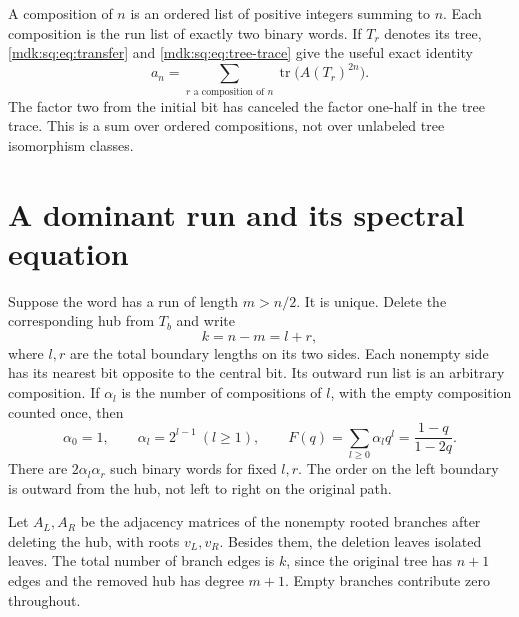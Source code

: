 \documentclass[11pt,letterpaper]{article}
\numberwithin{equation}{section}
\theoremstyle{remark}\newtheorem{remark}[theorem]{Remark}
\DeclareMathOperator{\tr}{tr}\DeclareMathOperator{\TV}{TV}
\begin{document}
A composition of $n$ is an ordered list of positive integers summing to $n$. Each composition is the run list of exactly two binary words. If $T_r$ denotes its tree, \eqref{mdk:sq:eq:transfer} and \eqref{mdk:sq:eq:tree-trace} give the useful exact identity
\begin{equation}\label{mdk:sq:eq:composition}
a_n=\sum_{r\text{ a composition of }n}\tr\bigl(A(T_r)^{2n}\bigr).
\end{equation}
The factor two from the initial bit has canceled the factor one-half in the tree trace. This is a sum over ordered compositions, not over unlabeled tree isomorphism classes.

\section{A dominant run and its spectral equation}\label{mdk:sq:sec:long}
Suppose the word has a run of length $m>n/2$. It is unique. Delete the corresponding hub from $T_b$ and write
\[
k=n-m=l+r,
\]
where $l,r$ are the total boundary lengths on its two sides. Each nonempty side has its nearest bit opposite to the central bit. Its outward run list is an arbitrary composition. If $\alpha_l$ is the number of compositions of $l$, with the empty composition counted once, then
\begin{equation}\label{mdk:sq:eq:F}
\alpha_0=1,\qquad\alpha_l=2^{l-1}\ (l\ge1),\qquad
F(q)=\sum_{l\ge0}\alpha_lq^l=\frac{1-q}{1-2q}.
\end{equation}
There are $2\alpha_l\alpha_r$ such binary words for fixed $l,r$. The order on the left boundary is outward from the hub, not left to right on the original path.

Let $A_L,A_R$ be the adjacency matrices of the nonempty rooted branches after deleting the hub, with roots $v_L,v_R$. Besides them, the deletion leaves isolated leaves. The total number of branch edges is $k$, since the original tree has $n+1$ edges and the removed hub has degree $m+1$. Empty branches contribute zero throughout.
\end{document}
